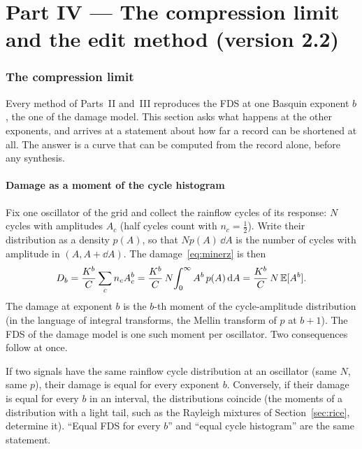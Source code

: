 \part*{Part IV --- The compression limit and the edit method (version 2.2)}

\section{The compression limit}\label{sec:limit}

Every method of Parts~II and~III reproduces the FDS at one Basquin exponent $b$, the one of the damage
model. This section asks what happens at the other exponents, and arrives at a statement about how far a
record can be shortened at all. The answer is a curve that can be computed from the record alone, before
any synthesis.

\subsection{Damage as a moment of the cycle histogram}\label{sec:mellin}

Fix one oscillator of the grid and collect the rainflow cycles of its response: $N$ cycles with
amplitudes $A_c$ (half cycles count with $n_c = \tfrac12$). Write their distribution as a density $p(A)$,
so that $N p(A)\,\dd A$ is the number of cycles with amplitude in $(A, A+\dd A)$. The
damage~\eqref{eq:minerz} is then
\begin{equation}\label{eq:mellin}
  D_b = \frac{K^b}{C}\sum_c n_c A_c^b = \frac{K^b}{C}\,N\!\int_0^\infty A^b\,p(A)\,\mathrm{d} A
  = \frac{K^b}{C}\,N\,\mathbb{E}[A^b].
\end{equation}
The damage at exponent $b$ is the $b$-th moment of the cycle-amplitude distribution (in the language of
integral transforms, the Mellin transform of $p$ at $b+1$). The FDS of the damage model is one such
moment per oscillator. Two consequences follow at once.

\begin{result}
If two signals have the same rainflow cycle distribution at an oscillator (same $N$, same $p$), their
damage is equal for every exponent $b$. Conversely, if their damage is equal for every $b$ in an
interval, the distributions coincide (the moments of a distribution with a light tail, such as the
Rayleigh mixtures of Section~\ref{sec:rice}, determine it). ``Equal FDS for every $b$'' and ``equal
cycle histogram'' are the same statement.
\end{result}

